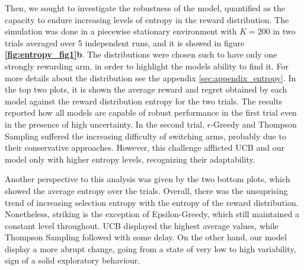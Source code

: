 \noindent Then, we sought to investigate the robustness of the model, quantified as the capacity to endure increasing levels of entropy in the reward distribution.
The simulation was done in a piecewise stationary environment with $K=200$ in two trials averaged over 5 independent runs, and it is showed in figure \textbf{\ref{fig:entropy_fig1}b}.
The distributions were chosen such to have only one strongly rewarding arm, in order to highlight the models ability to find it.
For more details about the distribution see the appendix \ref{sec:appendix_entropy}.
In the top two plots, it is shown the average reward and regret obtained by each model against the reward distribution entropy for the two trials.
The results reported how all models are capable of robust performance in the first trial even in the presence of high uncertainty.
In the second trial, $\epsilon$-Greedy and Thompson Sampling suffered the increasing difficulty of switching arms, probably due to their conservative approaches. However, this challenge afflicted UCB and our model only with higher entropy levels, recognizing their adaptability.

Another perspective to this analysis was given by the two bottom plots, which showed the average entropy over the trials.
Overall, there was the unsuprising trend of increasing selection entropy with the entropy of the reward distribution. Nonetheless, striking is the exception of Epsilon-Greedy, which still maintained a constant level throughout.
UCB displayed the highest average values, while Thompson Sampling followed with some delay.
On the other hand, our model display a more abrupt change, going from a state of very low to high variability, sign of a solid exploratory behaviour.



